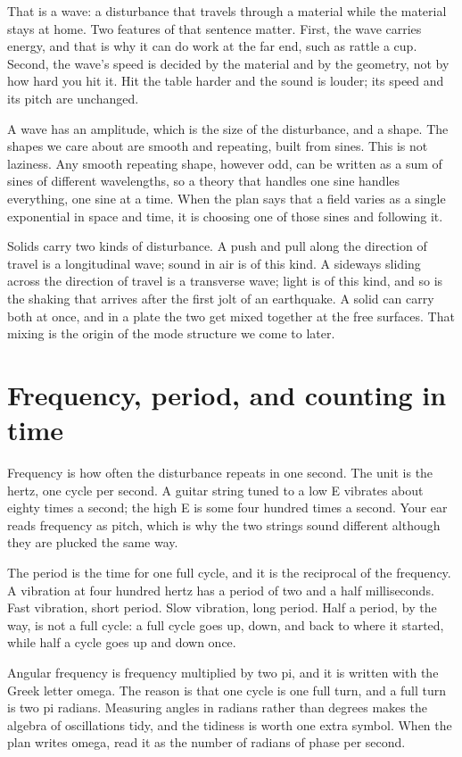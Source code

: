 \documentclass[11pt]{article}
\begin{document}
That is a wave: a disturbance that travels through a material while the material stays at home. Two features
of that sentence matter. First, the wave carries energy, and that is why it can do work at the far end, such
as rattle a cup. Second, the wave's speed is decided by the material and by the geometry, not by how hard you
hit it. Hit the table harder and the sound is louder; its speed and its pitch are unchanged.

A wave has an amplitude, which is the size of the disturbance, and a shape. The shapes we care about are
smooth and repeating, built from sines. This is not laziness. Any smooth repeating shape, however odd, can be
written as a sum of sines of different wavelengths, so a theory that handles one sine handles everything, one
sine at a time. When the plan says that a field varies as a single exponential in space and time, it is
choosing one of those sines and following it.

Solids carry two kinds of disturbance. A push and pull along the direction of travel is a longitudinal wave;
sound in air is of this kind. A sideways sliding across the direction of travel is a transverse wave; light
is of this kind, and so is the shaking that arrives after the first jolt of an earthquake. A solid can carry
both at once, and in a plate the two get mixed together at the free surfaces. That mixing is the origin of
the mode structure we come to later.

\section{Frequency, period, and counting in time}

Frequency is how often the disturbance repeats in one second. The unit is the hertz, one cycle per second. A
guitar string tuned to a low E vibrates about eighty times a second; the high E is some four hundred times a
second. Your ear reads frequency as pitch, which is why the two strings sound different although they are
plucked the same way.

The period is the time for one full cycle, and it is the reciprocal of the frequency. A vibration at four
hundred hertz has a period of two and a half milliseconds. Fast vibration, short period. Slow vibration, long
period. Half a period, by the way, is not a full cycle: a full cycle goes up, down, and back to where it
started, while half a cycle goes up and down once.

Angular frequency is frequency multiplied by two pi, and it is written with the Greek letter omega. The
reason is that one cycle is one full turn, and a full turn is two pi radians. Measuring angles in radians
rather than degrees makes the algebra of oscillations tidy, and the tidiness is worth one extra symbol. When
the plan writes omega, read it as the number of radians of phase per second.
\end{document}
